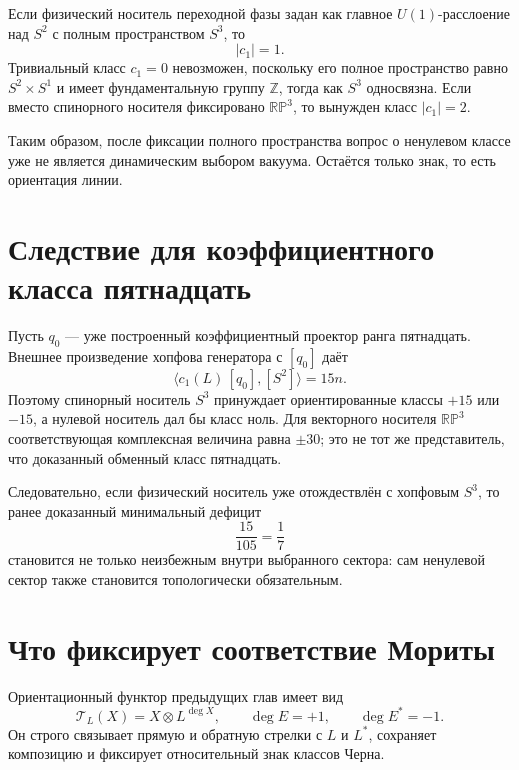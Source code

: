 \begin{theorem}
Если физический носитель переходной фазы задан как главное
$U(1)$-расслоение над $S^2$ с полным пространством $S^3$, то
\begin{equation}
 |c_1|=1.
\end{equation}
Тривиальный класс $c_1=0$ невозможен, поскольку его полное пространство
равно $S^2\times S^1$ и имеет фундаментальную группу $\mathbb Z$, тогда
как $S^3$ односвязна. Если вместо спинорного носителя фиксировано
$\mathbb{RP}^3$, то вынужден класс $|c_1|=2$.
\end{theorem}

Таким образом, после фиксации полного пространства вопрос о ненулевом
классе уже не является динамическим выбором вакуума. Остаётся только знак,
то есть ориентация линии.

\section{Следствие для коэффициентного класса пятнадцать}

Пусть $q_0$ --- уже построенный коэффициентный проектор ранга пятнадцать.
Внешнее произведение хопфова генератора с $[q_0]$ даёт
\begin{equation}
 \langle c_1(L)\,[q_0],[S^2]\rangle
 =15n.
 \label{eq:v5-carrier-coefficient-charge}
\end{equation}
Поэтому спинорный носитель $S^3$ принуждает ориентированные классы
$+15$ или $-15$, а нулевой носитель дал бы класс ноль. Для векторного
носителя $\mathbb{RP}^3$ соответствующая комплексная величина равна
$\pm30$; это не тот же представитель, что доказанный обменный класс
пятнадцать.

Следовательно, если физический носитель уже отождествлён с хопфовым
$S^3$, то ранее доказанный минимальный дефицит
\begin{equation}
 \frac{15}{105}=\frac17
\end{equation}
становится не только неизбежным внутри выбранного сектора: сам ненулевой
сектор также становится топологически обязательным.

\section{Что фиксирует соответствие Мориты}

Ориентационный функтор предыдущих глав имеет вид
\begin{equation}
 \mathcal T_L(X)=X\otimes L^{\deg X},
 \qquad
 \deg E=+1,
 \qquad
 \deg E^*=-1.
 \label{eq:v5-carrier-morita-functor}
\end{equation}
Он строго связывает прямую и обратную стрелки с $L$ и $L^*$, сохраняет
композицию и фиксирует относительный знак классов Черна.

